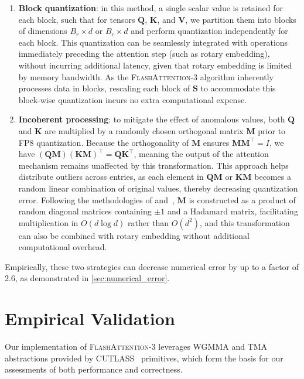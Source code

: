 \begin{enumerate}

\item \textbf{Block quantization}: in this method, a single scalar value is retained for each block, such that for tensors $\mathbf{Q}$, $\mathbf{K}$, and $\mathbf{V}$, we partition them into blocks of dimensions $B_r \times d$ or $B_c \times d$ and perform quantization independently for each block. This quantization can be seamlessly integrated with operations immediately preceding the attention step (such as rotary embedding), without incurring additional latency, given that rotary embedding is limited by memory bandwidth. As the \textsc{FlashAttention-3} algorithm inherently processes data in blocks, rescaling each block of $\mathbf{S}$ to accommodate this block-wise quantization incurs no extra computational expense.

\item \textbf{Incoherent processing}: to mitigate the effect of anomalous values, both $\mathbf{Q}$ and $\mathbf{K}$ are multiplied by a randomly chosen orthogonal matrix $\mathbf{M}$ prior to FP8 quantization. Because the orthogonality of $\mathbf{M}$ ensures $\mathbf{M} \mathbf{M}^\top = I$, we have $(\mathbf{Q} \mathbf{M}) (\mathbf{K} \mathbf{M})^\top = \mathbf{Q} \mathbf{K}^\top$, meaning the output of the attention mechanism remains unaffected by this transformation. This approach helps distribute outliers across entries, as each element in $\mathbf{Q} \mathbf{M}$ or $\mathbf{K} \mathbf{M}$ becomes a random linear combination of original values, thereby decreasing quantization error. Following the methodologies of \citet{chee2024quip} and~\citet{tseng2024quip}, $\mathbf{M}$ is constructed as a product of random diagonal matrices containing $\pm 1$ and a Hadamard matrix, facilitating multiplication in $O(d \log d)$ rather than $O(d^2)$, and this transformation can also be combined with rotary embedding without additional computational overhead.
\end{enumerate}

Empirically, these two strategies can decrease numerical error by up to a factor of 2.6, as demonstrated in \cref{sec:numerical_error}.

\section{Empirical Validation}
\label{sec:exp}

Our implementation of \textsc{FlashAttention-3} leverages WGMMA and TMA abstractions provided by CUTLASS~\citep{Thakkar_CUTLASS_2023} primitives, which form the basis for our assessments of both performance and correctness.

